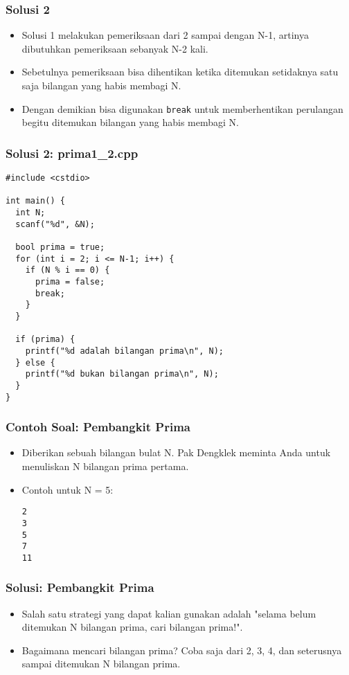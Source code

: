 \begin{frame}
\frametitle{Solusi 2}
\begin{itemize}
  \item Solusi 1 melakukan pemeriksaan dari 2 sampai dengan N-1, artinya dibutuhkan pemeriksaan sebanyak N-2 kali.
  \item Sebetulnya pemeriksaan bisa dihentikan ketika ditemukan setidaknya satu saja bilangan yang habis membagi N.
  \item Dengan demikian bisa digunakan \texttt{break} untuk memberhentikan perulangan begitu ditemukan bilangan yang habis membagi N.
\end{itemize}
\end{frame}

\begin{frame}[fragile]
\frametitle{Solusi 2: prima1\_2.cpp}
\begin{lstlisting}
#include <cstdio>

int main() {
  int N;
  scanf("%d", &N);

  bool prima = true;
  for (int i = 2; i <= N-1; i++) {
    if (N % i == 0) {
      prima = false;
      break;
    }
  }

  if (prima) {
    printf("%d adalah bilangan prima\n", N);
  } else {
    printf("%d bukan bilangan prima\n", N);
  }
}
\end{lstlisting}
\end{frame}

\begin{frame}[fragile]
\frametitle{Contoh Soal: Pembangkit Prima}
\begin{itemize}
  \item Diberikan sebuah bilangan bulat N. Pak Dengklek meminta Anda untuk menuliskan N bilangan prima pertama.
  \item Contoh untuk N = 5:
\begin{lstlisting}
2
3
5
7
11
\end{lstlisting}
\end{itemize}
\end{frame}

\begin{frame}
\frametitle{Solusi: Pembangkit Prima}
\begin{itemize}
  \item Salah satu strategi yang dapat kalian gunakan adalah "selama belum ditemukan N bilangan prima, cari bilangan prima!".
  \item Bagaimana mencari bilangan prima? Coba saja dari 2, 3, 4, dan seterusnya sampai ditemukan N bilangan prima.
\end{itemize}
\end{frame}

